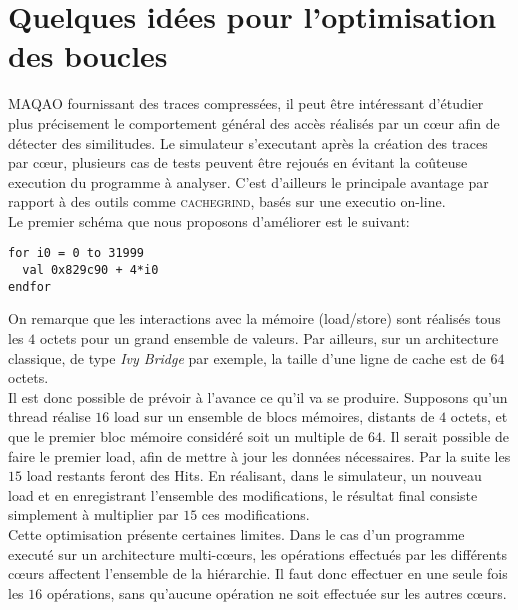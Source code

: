 \section{Quelques idées pour l'optimisation des boucles}
\indent \textsc{MAQAO} fournissant des traces compressées, il peut être intéressant d'étudier plus précisement le comportement général des accès réalisés par un c{\oe}ur afin de détecter des similitudes. Le simulateur s'executant après la création des traces par c{\oe}ur, plusieurs cas de tests peuvent être rejoués en évitant la coûteuse execution du programme à analyser. C'est d'ailleurs le principale avantage par rapport à des outils comme \textsc{cachegrind}, basés sur une executio on-line. \\

\indent Le premier schéma que nous proposons d'améliorer est le suivant:\\
\begin{lstlisting}
for i0 = 0 to 31999
  val 0x829c90 + 4*i0
endfor
\end{lstlisting}

\indent On remarque que les interactions avec la mémoire (load/store) sont réalisés tous les $4$ octets pour un grand ensemble de valeurs. Par ailleurs, sur un architecture classique, de type \textit{Ivy Bridge} par exemple, la taille d'une ligne de cache est de $64$ octets. \\

\indent Il est donc possible de prévoir à l'avance ce qu'il va se produire. Supposons qu'un thread réalise $16$ load sur un ensemble de blocs mémoires, distants de $4$ octets, et que le premier bloc mémoire considéré soit un multiple de $64$. Il serait possible de faire le premier load, afin de mettre à jour les données nécessaires. Par la suite les $15$ load restants feront des Hits. En réalisant, dans le simulateur, un nouveau load et en enregistrant l'ensemble des modifications, le résultat final consiste simplement à multiplier par $15$ ces modifications. \\

\indent Cette optimisation présente certaines limites. Dans le cas d'un programme executé sur un architecture multi-c{\oe}urs, les opérations effectués par les différents c{\oe}urs affectent l'ensemble de la hiérarchie. Il faut donc effectuer en une seule fois les $16$ opérations, sans qu'aucune opération ne soit effectuée sur les autres c{\oe}urs.
